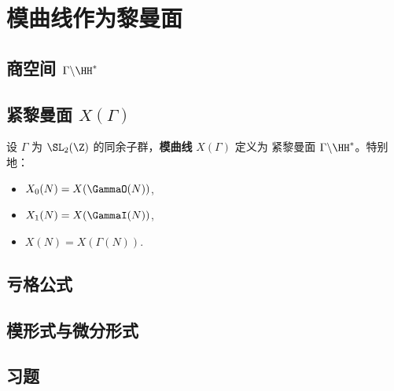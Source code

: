 \chapter{模曲线作为黎曼面}
\label{ch:modular-curves-riemann}

\section{商空间 $\Gamma \backslash \HH^*$}


\section{紧黎曼面 $X(\Gamma)$}

\begin{definition}
设 $\Gamma$ 为 $\SL_2(\Z)$ 的同余子群，\textbf{模曲线} $X(\Gamma)$ 定义为
紧黎曼面 $\Gamma \backslash \HH^*$。特别地：
\begin{itemize}
  \item $X_0(N) = X(\GammaO(N))$,
  \item $X_1(N) = X(\GammaI(N))$,
  \item $X(N) = X(\Gamma(N))$.
\end{itemize}
\end{definition}

\section{亏格公式}


\section{模形式与微分形式}


\section{习题}
